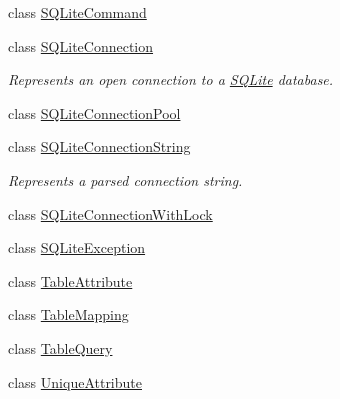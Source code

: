 \begin{DoxyCompactItemize}
\item 
class \hyperlink{classSQLite_1_1SQLiteCommand}{S\+Q\+Lite\+Command}
\item 
class \hyperlink{classSQLite_1_1SQLiteConnection}{S\+Q\+Lite\+Connection}
\begin{DoxyCompactList}\small\item\em Represents an open connection to a \hyperlink{namespaceSQLite}{S\+Q\+Lite} database. \end{DoxyCompactList}\item 
class \hyperlink{classSQLite_1_1SQLiteConnectionPool}{S\+Q\+Lite\+Connection\+Pool}
\item 
class \hyperlink{classSQLite_1_1SQLiteConnectionString}{S\+Q\+Lite\+Connection\+String}
\begin{DoxyCompactList}\small\item\em Represents a parsed connection string. \end{DoxyCompactList}\item 
class \hyperlink{classSQLite_1_1SQLiteConnectionWithLock}{S\+Q\+Lite\+Connection\+With\+Lock}
\item 
class \hyperlink{classSQLite_1_1SQLiteException}{S\+Q\+Lite\+Exception}
\item 
class \hyperlink{classSQLite_1_1TableAttribute}{Table\+Attribute}
\item 
class \hyperlink{classSQLite_1_1TableMapping}{Table\+Mapping}
\item 
class \hyperlink{classSQLite_1_1TableQuery}{Table\+Query}
\item 
class \hyperlink{classSQLite_1_1UniqueAttribute}{Unique\+Attribute}
\end{DoxyCompactItemize}
